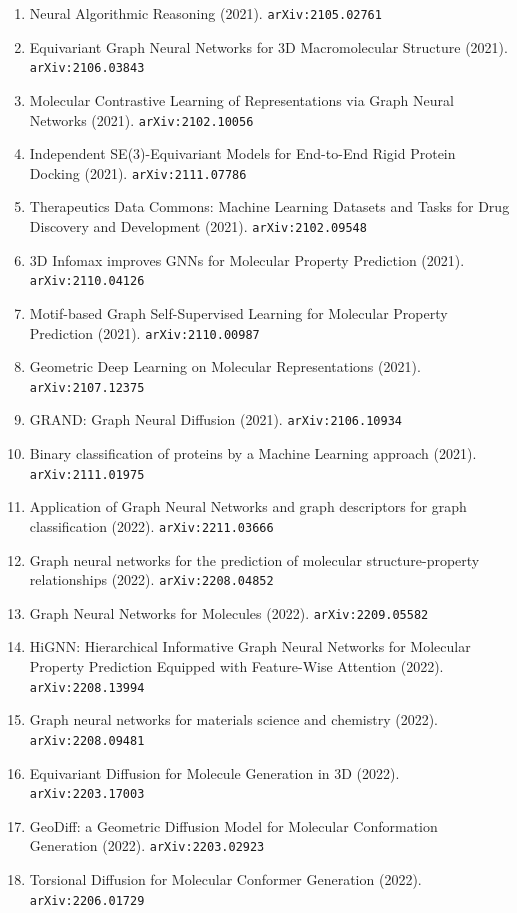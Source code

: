 \documentclass[11pt]{article}
\begin{document}
\begin{enumerate}
  \item Neural Algorithmic Reasoning (2021). \texttt{arXiv:2105.02761}
  \item Equivariant Graph Neural Networks for 3D Macromolecular Structure (2021). \texttt{arXiv:2106.03843}
  \item Molecular Contrastive Learning of Representations via Graph Neural
  Networks (2021). \texttt{arXiv:2102.10056}
  \item Independent SE(3)-Equivariant Models for End-to-End Rigid Protein
  Docking (2021). \texttt{arXiv:2111.07786}
  \item Therapeutics Data Commons: Machine Learning Datasets and Tasks for Drug
  Discovery and Development (2021). \texttt{arXiv:2102.09548}
  \item 3D Infomax improves GNNs for Molecular Property Prediction (2021). \texttt{arXiv:2110.04126}
  \item Motif-based Graph Self-Supervised Learning for Molecular Property
  Prediction (2021). \texttt{arXiv:2110.00987}
  \item Geometric Deep Learning on Molecular Representations (2021). \texttt{arXiv:2107.12375}
  \item GRAND: Graph Neural Diffusion (2021). \texttt{arXiv:2106.10934}
  \item Binary classification of proteins by a Machine Learning approach (2021). \texttt{arXiv:2111.01975}
  \item Application of Graph Neural Networks and graph descriptors for graph
  classification (2022). \texttt{arXiv:2211.03666}
  \item Graph neural networks for the prediction of molecular structure-property
  relationships (2022). \texttt{arXiv:2208.04852}
  \item Graph Neural Networks for Molecules (2022). \texttt{arXiv:2209.05582}
  \item HiGNN: Hierarchical Informative Graph Neural Networks for Molecular
  Property Prediction Equipped with Feature-Wise Attention (2022). \texttt{arXiv:2208.13994}
  \item Graph neural networks for materials science and chemistry (2022). \texttt{arXiv:2208.09481}
  \item Equivariant Diffusion for Molecule Generation in 3D (2022). \texttt{arXiv:2203.17003}
  \item GeoDiff: a Geometric Diffusion Model for Molecular Conformation
  Generation (2022). \texttt{arXiv:2203.02923}
  \item Torsional Diffusion for Molecular Conformer Generation (2022). \texttt{arXiv:2206.01729}

\end{enumerate}
\end{document}
